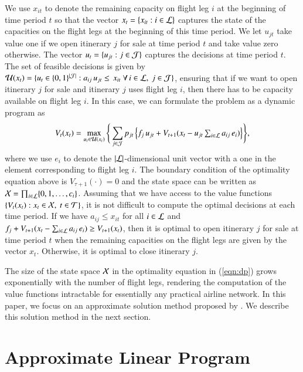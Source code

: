 We use $x_{it}$ to denote the remaining capacity on flight leg $i$ at the beginning of time period $t$ so that the vector $x_t = \{ x_{it} : i \in {\cal L}\}$ captures the state of the capacities on the flight legs at the beginning of this time period. We let $u_{jt}$ take value one if we open itinerary $j$ for sale at  time period $t$ and take value zero otherwise. The vector $u_t = \{ u_{jt} : j \in {\cal J}\}$ captures the decisions at time period $t$. The set of feasible decisions is given by ${\cal U}(x_t) = \{ u_t \in \{0,1\}^{|{\cal J}|} : a_{ij} {\,} u_{jt} \leq {\,} x_{it} ~ \forall {\,}  i \in {\cal L},~j \in {\cal J}\}$, ensuring that if we want to open itinerary $j$ for sale and itinerary $j$ uses flight leg $i$, then there has to be capacity available on flight leg $i$. In this case, we can formulate the problem as a dynamic program as
%
%
\begin{align}
V_t(x_t)
=
\max_{u_t \in {\cal U}(x_t)} \Bigg\{  \sum_{j \in {\cal J}} p_{jt} {\,} \Big\{ f_j  {\,} u_{jt} + V_{t+1}(x_t - \textstyle u_{jt} \sum_{i \in {\cal L}} a_{ij} {\,} e_i ) \Big\}  \Bigg\},
\label{eqn:dp}
\end{align}
%
%
where we use $e_i$ to denote the $|{\cal L}|$-dimensional unit vector with a one in the element corresponding to flight leg $i$. The boundary condition of the optimality equation above is $V_{\tau+1} (\cdot) = 0$ and the state space can be written as ${\cal X} = \prod_{i \in {\cal L}} \{0,1,\ldots,c_i\}$. Assuming that we have access to the value functions $\{ V_t(x_t) : x_t \in {\cal X},~ t \in {\cal T}\}$, it is not difficult to compute the optimal decisions at each time period. If we have $a_{ij} \leq x_{it}$ for all $i \in {\cal L}$ and $f_j + V_{t+1}(x_t - \sum_{i \in {\cal L}} a_{ij} {\,} e_i ) \geq V_{t+1}(x_t)$, then it is optimal to open itinerary $j$ for sale at time period $t$ when the remaining capacities on the flight legs are given by the vector $x_t$. Otherwise, it is optimal to close itinerary $j$. 


The size of the state space ${\cal X}$ in the optimality equation in (\ref{eqn:dp}) grows exponentially with the number of flight legs, rendering the computation of the value functions intractable for essentially any practical airline network. In this paper, we focus on an approximate solution method proposed by . We describe this solution method in the next section.

\section{Approximate Linear Program}
\label{sec:alp}

